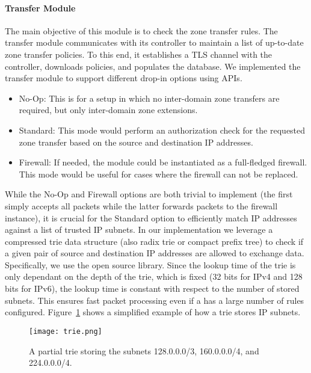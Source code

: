 \paragraph{Transfer Module}
The main objective of this module is to check the zone transfer rules. The transfer
module communicates with its controller to maintain a list of up-to-date zone transfer policies.
To this end, it establishes a TLS channel with the controller, downloads policies,
and populates the database.
We implemented the transfer module to support different drop-in options using APIs.

\begin{itemize}
	\item No-Op: This is for a setup in which no inter-domain zone transfers are required,
	      but only inter-domain zone extensions.
	\item Standard: This mode would perform an authorization check for the requested
	      zone transfer based on the source and destination IP addresses.
	\item Firewall: If needed, the module could be instantiated as a full-fledged firewall.
	      This mode would be useful for cases where the firewall can not be replaced.
\end{itemize}

While the No-Op and Firewall options are both trivial to implement (the first simply accepts all
packets while the latter forwards packets to the firewall instance), it is crucial for the Standard
option to efficiently match IP addresses against a list of trusted IP subnets. In our implementation
we leverage a compressed trie data structure (also radix trie or compact prefix tree) to check if a
given pair of source and destination IP addresses are allowed to exchange data. Specifically,
we use the open source  library. Since the
lookup time of the trie is only dependant on the depth of the trie, which is fixed (32 bits for IPv4 and 128
bits for IPv6), the lookup time is constant with respect to the number of stored subnets. This
ensures fast packet processing even if a \tp has a large number of rules configured.
Figure~\ref{fig:trie} shows a simplified example of how a trie stores IP subnets.

\begin{figure}[htb]
	\begin{center}
		\texttt{[image: trie.png]}
	\end{center}
	\caption{A partial trie storing the subnets 128.0.0.0/3, 160.0.0.0/4, and 224.0.0.0/4.}
	\label{fig:trie}
\end{figure}

